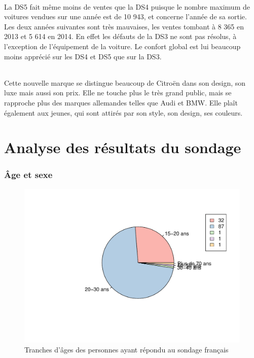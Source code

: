 \documentclass[12pt]{article}\usepackage[]{graphicx}\usepackage[]{color}
\makeatletter
\def\maxwidth{ %
  \ifdim\Gin@nat@width>\linewidth
    \linewidth
  \else
    \Gin@nat@width
  \fi
}
\newenvironment{knitrout}{}{} %
\makeatother
\begin{document}
\paragraph{} La DS5 fait même moins de ventes que la DS4 puisque le nombre
maximum de voitures vendues sur une année est de 10 943, et concerne l'année de
sa sortie. Les deux années suivantes sont très mauvaises, les ventes tombant
à 8 365 en 2013 et 5 614 en 2014. En effet les défauts de la DS3 ne sont pas résolus,
à l'exception de l'équipement de la voiture. Le confort global est lui beaucoup
moins apprécié sur les DS4 et DS5 que sur la DS3.

\paragraph{} Cette nouvelle marque se distingue beaucoup de Citroën dans son
design, son luxe mais aussi son prix. Elle ne touche plus le très grand public,
mais se rapproche plus des marques allemandes telles que Audi et BMW. Elle
plaît également aux jeunes, qui sont attirés par son style, son design, ses
couleurs.

\break
\part{Analyse des résultats du sondage}

\section{Âge et sexe}



\begin{knitrout}
\color{fgcolor}\begin{figure}[H]
\includegraphics[width=\maxwidth]{figure/tranche_age_fr-1} \caption[Tranches d'âges des personnes ayant répondu au sondage français]{Tranches d'âges des personnes ayant répondu au sondage français}\label{fig:tranche age fr}
\end{figure}


\end{knitrout}
\end{document}
